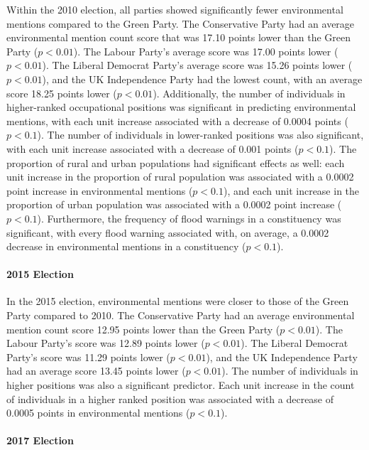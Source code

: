 \documentclass[12pt,letterpaper]{article}
\begin{document}
Within the 2010 election, all parties showed significantly fewer environmental mentions compared to the Green Party. The Conservative Party had an average environmental mention count score that was 17.10 points lower than the Green Party ($p<0.01$). The Labour Party's average score was 17.00 points lower ($p<0.01$). The Liberal Democrat Party's average score was 15.26 points lower ($p<0.01$), and the UK Independence Party had the lowest count, with an average score 18.25 points lower ($p<0.01$). Additionally, the number of individuals in higher-ranked occupational positions was significant in predicting environmental mentions, with each unit increase associated with a decrease of 0.0004 points ($p<0.1$). The number of individuals in lower-ranked positions was also significant, with each unit increase associated with a decrease of 0.001 points ($p<0.1$). The proportion of rural and urban populations had significant effects as well: each unit increase in the proportion of rural population was associated with a 0.0002 point increase in environmental mentions ($p<0.1$), and each unit increase in the proportion of urban population was associated with a 0.0002 point increase ($p<0.1$). Furthermore, the frequency of flood warnings in a constituency was significant, with every flood warning associated with, on average, a 0.0002 decrease in environmental mentions in a constituency ($p < 0.1$).

\paragraph{2015 Election}

In the 2015 election, environmental mentions were closer to those of the Green Party compared to 2010. The Conservative Party had an average environmental mention count score 12.95 points lower than the Green Party ($p<0.01$). The Labour Party's score was 12.89 points lower ($p<0.01$). The Liberal Democrat Party's score was 11.29 points lower ($p<0.01$), and the UK Independence Party had an average score 13.45 points lower ($p<0.01$). The number of individuals in higher positions was also a significant predictor. Each unit increase in the count of individuals in a higher ranked position was associated with a decrease of 0.0005 points in environmental mentions ($p<0.1$).

\paragraph{2017 Election}
\end{document}
